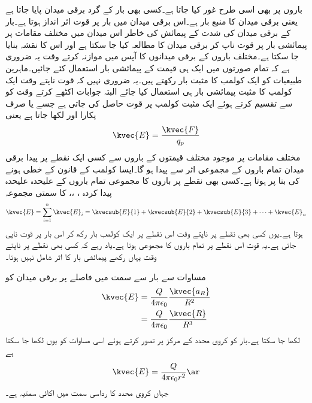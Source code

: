 باروں پر بھی اسی طرح غور کیا جاتا ہے۔کسی بھی بار  کے گرد برقی میدان پایا جاتا ہے یعنی برقی میدان کا منبع بار ہے۔اس برقی میدان میں بار پر قوت اثر انداز ہوتا ہے۔بار  کے برقی میدان کی شدت کے پیمائش کی خاطر اس میدان میں مختلف مقامات پر پیمائشی بار   پر قوت  ناپ کر برقی میدان کا مطالعہ کیا جا سکتا ہے اور اس کا نقشہ بنایا جا سکتا ہے۔مختلف باروں کے برقی میدانوں کا آپس میں موازنہ کرتے وقت یہ ضروری ہے کہ تمام صورتوں میں ایک ہی قیمت کے پیمائشی بار  استعمال کئے جائیں۔ماہرین طبیعیات  کو ایک کولمب کا مثبت بار  رکھتے ہیں۔یہ ضروری نہیں کہ قوت ناپتے وقت ایک کولمب کا مثبت پیمائشی بار ہی استعمال کیا جائے البتہ جوابات اکٹھے کرتے وقت  کو  سے تقسیم کرتے ہوئے ایک مثبت کولمب پر قوت حاصل کی جاتی ہے جسے  یا صرف  پکارا اور  لکھا جاتا ہے یعنی
\begin{align}\label{مساوات_کولمب_برقی_شدت_اور_قوت}
\kvec{E}=\frac{\kvec{F}}{q_p}
\end{align}
مختلف مقامات پر موجود مختلف قیمتوں کے باروں سے کسی ایک نقطے پر  پیدا برقی میدان  تمام باروں کے مجموعی اثر سے پیدا ہو گا۔ایسا کولمب کے قانون کے خطی ہونے کی بنا پر ہوتا ہے۔کسی بھی نقطے پر  باروں کا مجموعی  تمام باروں کے علیحدہ علیحدہ پیدا کردہ  ،  ،،  کا سمتی مجموعہ
\begin{align}
\kvec{E}=\sum_{i=1}^n \kvec{E}_i=\kvecsub{E}{1}+\kvecsub{E}{2}+\kvecsub{E}{3}+\cdots+\kvec{E}_n 
\end{align}
 ہوتا ہے۔یوں کسی بھی نقطے   پر  ناپتے وقت اس نقطے پر ایک کولمب بار  رکھ کر اس بار پر قوت ناپی جاتی ہے۔یہ قوت اس نقطے پر تمام باروں کا مجموعی   ہوتا ہے۔یاد رہے کہ کسی بھی نقطے پر   ناپتے وقت یہاں رکھے پیمائشی بار  کا اثر شامل نہیں ہوتا۔

مساوات   سے  بار  سے  سمت میں  فاصلے پر برقی میدان کو
\begin{gather}
\begin{aligned}\label{مساوات_کولمب_قوت_کی_عمومی_مساوات}
\kvec{E}&=\frac{Q}{4 \pi \epsilon_0}\frac{\kvec{a_{R}}}{ R^2}\\
&=\frac{Q}{4 \pi \epsilon_0}\frac{\kvec{R}}{ R^3}
\end{aligned}
\end{gather}
لکھا جا سکتا ہے۔بار کو کروی محدد کے مرکز پر تصور کرتے ہوئے اسی مساوات کو یوں لکھا جا سکتا ہے
\begin{align}\label{مساوات_کولمب_نقطہ_بار_کروی_رداس_پر_تبدیل_نہیں_ہوتا}
\kvec{E}=\frac{Q}{4 \pi \epsilon_0 r^2} \ar
\end{align}
جہاں    کروی محدد کا رداسی سمت میں اکائی سمتیہ ہے۔

